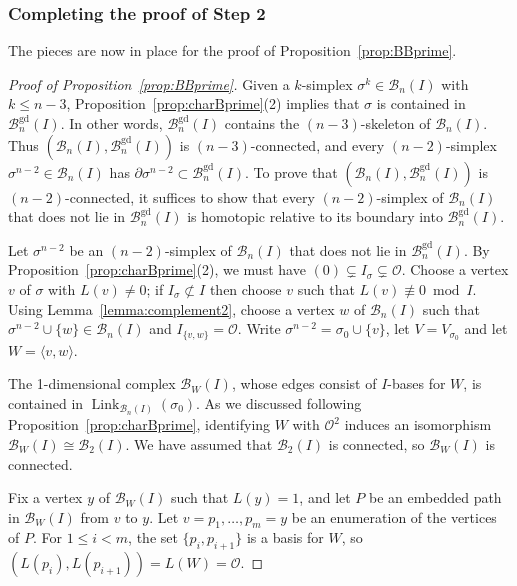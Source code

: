 \documentclass[11 pt]{article}
\theoremstyle{plain}
\theoremstyle{definition}
\numberwithin{equation}{section}
\newcommand\Span[1]{\ensuremath{\langle #1 \rangle}}
\renewcommand{\O}{\mathcal{O}}
\newcommand\PartialBases{\ensuremath{\mathcal{B}}}
\newcommand{\PB}{\PartialBases}
\newcommand{\PartialBasesGood}{\PartialBases^{\text{gd}}}
\newcommand{\PBg}{\PartialBasesGood}
\DeclareMathOperator{\Link}{Link}
\newcommand\iso{\cong}
\begin{document}
\subsubsection{Completing the proof of Step 2}
The pieces are now in place for the proof of Proposition~\ref{prop:BBprime}.

\begin{proof}[Proof of Proposition~\ref{prop:BBprime}]
Given a $k$-simplex $\sigma^k\in \PB_n(I)$ with $k\leq n-3$, 
Proposition~\ref{prop:charBprime}(2) implies that $\sigma$ is contained in $\PartialBasesGood_n(I)$. In other words, $\PBg_n(I)$ contains the $(n-3)$-skeleton of $\PartialBases_n(I)$. Thus $(\PartialBases_n(I),\PartialBasesGood_n(I))$ is $(n-3)$-connected, and every  
$(n-2)$-simplex $\sigma^{n-2}\in \PartialBases_n(I)$ has $\partial \sigma^{n-2}\subset \PartialBasesGood_n(I)$.
To prove that $(\PartialBases_n(I),\PartialBasesGood_n(I))$ is $(n-2)$-connected, it suffices to show that 
every $(n-2)$-simplex of $\PartialBases_n(I)$ that does not lie in $\PartialBasesGood_n(I)$ is homotopic
relative to its boundary into $\PartialBasesGood_n(I)$.

Let $\sigma^{n-2}$ be an $(n-2)$-simplex of $\PartialBases_n(I)$ that does not lie in $\PartialBasesGood_n(I)$. 
By Proposition~\ref{prop:charBprime}(2), we must have $(0)\subsetneq I_\sigma \subsetneq \O$.
Choose a vertex $v$ of $\sigma$ with $L(v)\neq 0$; if $I_\sigma\not\subset I$ then choose $v$ such that $L(v)\not\equiv 0\bmod{I}$.  Using Lemma~\ref{lemma:complement2}, choose a vertex $w$ of $\PartialBases_n(I)$
such that $\sigma^{n-2} \cup \{w\} \in \PartialBases_n(I)$ and $I_{\{v,w\}} = \O$.
Write $\sigma^{n-2}=\sigma_0 \cup \{v\}$, let $V=V_{\sigma_0}$ and let $W=\Span{v,w}$.  %

The 1-dimensional complex $\PB_W(I)$, whose edges consist of $I$-bases for $W$, is contained in $\Link_{\PartialBases_n(I)}(\sigma_0)$. 
As we discussed following Proposition~\ref{prop:charBprime}, identifying $W$ with $\O^2$ induces an isomorphism 
$\PB_W(I) \iso \PB_2(I)$. We have assumed that $\PB_2(I)$ is connected, so  $\PB_W(I)$ is connected.

Fix a vertex $y$ of $\PB_W(I)$ such that $L(y) = 1$, and let $P$ be an embedded path in $\PB_W(I)$ from
$v$ to $y$.  Let $v = p_1,\ldots,p_m=y$ be an enumeration of the vertices of $P$.  For
$1 \leq i < m$, the set $\{p_i,p_{i+1}\}$ is a basis for $W$, so $(L(p_i),L(p_{i+1})) = L(W) = \O$.


\end{proof}
\end{document}
